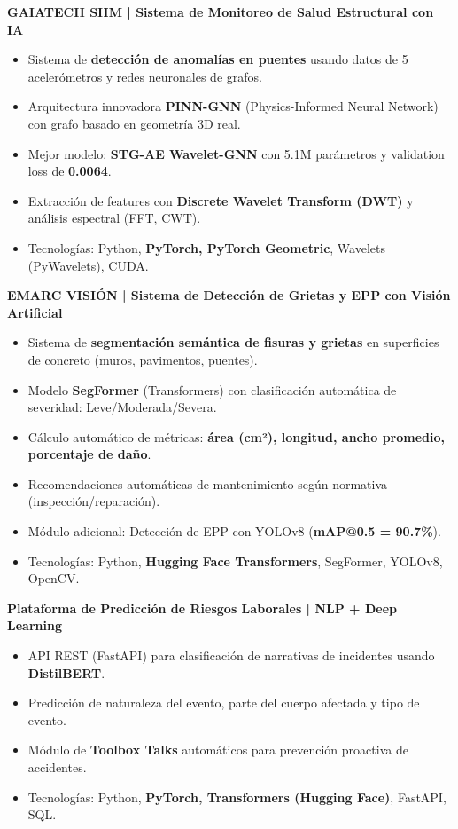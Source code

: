 \documentclass[10pt, a4paper]{article}
\begin{document}
\textbf{GAIATECH SHM | Sistema de Monitoreo de Salud Estructural con IA}
\begin{itemize}
    \item Sistema de \textbf{detección de anomalías en puentes} usando datos de 5 acelerómetros y redes neuronales de grafos.
    \item Arquitectura innovadora \textbf{PINN-GNN} (Physics-Informed Neural Network) con grafo basado en geometría 3D real.
    \item Mejor modelo: \textbf{STG-AE Wavelet-GNN} con 5.1M parámetros y validation loss de \textbf{0.0064}.
    \item Extracción de features con \textbf{Discrete Wavelet Transform (DWT)} y análisis espectral (FFT, CWT).
    \item Tecnologías: Python, \textbf{PyTorch, PyTorch Geometric}, Wavelets (PyWavelets), CUDA.
\end{itemize}

\vspace{1mm}

\textbf{EMARC VISIÓN | Sistema de Detección de Grietas y EPP con Visión Artificial}
\begin{itemize}
    \item Sistema de \textbf{segmentación semántica de fisuras y grietas} en superficies de concreto (muros, pavimentos, puentes).
    \item Modelo \textbf{SegFormer} (Transformers) con clasificación automática de severidad: Leve/Moderada/Severa.
    \item Cálculo automático de métricas: \textbf{área (cm²), longitud, ancho promedio, porcentaje de daño}.
    \item Recomendaciones automáticas de mantenimiento según normativa (inspección/reparación).
    \item Módulo adicional: Detección de EPP con YOLOv8 (\textbf{mAP@0.5 = 90.7\%}).
    \item Tecnologías: Python, \textbf{Hugging Face Transformers}, SegFormer, YOLOv8, OpenCV.
\end{itemize}

\vspace{1mm}

\textbf{Plataforma de Predicción de Riesgos Laborales | NLP + Deep Learning}
\begin{itemize}
    \item API REST (FastAPI) para clasificación de narrativas de incidentes usando \textbf{DistilBERT}.
    \item Predicción de naturaleza del evento, parte del cuerpo afectada y tipo de evento.
    \item Módulo de \textbf{Toolbox Talks} automáticos para prevención proactiva de accidentes.
    \item Tecnologías: Python, \textbf{PyTorch, Transformers (Hugging Face)}, FastAPI, SQL.
\end{itemize}
\end{document}
